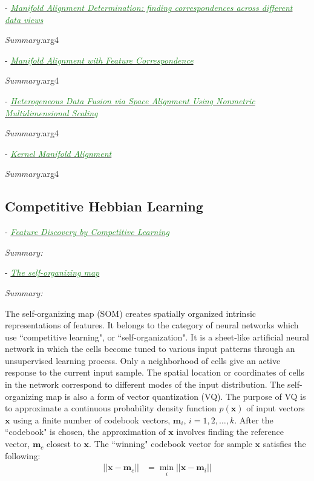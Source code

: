 \documentclass[]{article}
\newcommand{\paperentry}[4]{
            \hangindent=1cm
            \cite{#1} - \href{run:../References/#3}{\textcolor{ForestGreen}{\textit{#2}}}
            
            \noindent            
            \begin{minipage}[t]{0.1\linewidth}\hfill\end{minipage}
            \begin{minipage}[t]{0.8\linewidth}\textcolor{NavyBlue}{{\textit{Summary:}}}#4\end{minipage}
            \vspace{.25cm}
          }
\begin{document}
		\paperentry{Damianou2017ManifoldAlignmentDifferentDataView}
		{Manifold Alignment Determination: finding correspondences across different data views}
		{Manifold_Representation_Learning/Alignment/Damianou2017ManifoldAlignmentDifferentDataView.pdf}
		{arg4}
		
		\paperentry{Stanley2019ManAlignmentFeatureCorrespondence}
		{Manifold Alignment with Feature Correspondence}
		{Manifold_Representation_Learning/Alignment/Stanley2019ManAlignmentFeatureCorrespondence.pdf}
		{arg4}
		
		\paperentry{Choo2012HeterogeneousDataFusionGraphs}
		{Heterogeneous Data Fusion via Space Alignment Using Nonmetric Multidimensional Scaling}
		{Manifold_Representation_Learning/Alignment/Choo2012HeterogeneousDataFusionGraphs.pdf}
		{arg4}
		
		\paperentry{Tuia2015KernelManifoldAlignment}
		{Kernel Manifold Alignment}
		{Manifold_Representation_Learning/Alignment/Tuia2015KernelManifoldAlignment.pdf}
		{arg4}
	
	
	\subsection{Competitive Hebbian Learning}
	
	\paperentry
	{Rumelhart1985CHL}
	{Feature Discovery by Competitive Learning}
	{Manifold_Representation_Learning/CHL/Rumelhart1985CHL.pdf}
	{}
	
	\paperentry{Kohonen1990SOM}
	{The self-organizing map}
	{Manifold_Representation_Learning/CHL/Kohonen1990SOM.pdf}
	{}
	\newline
	The self-organizing map (SOM) creates spatially organized intrinsic representations of features.  It belongs to the category of neural networks which use ``competitive learning", or ``self-organization".  It is a sheet-like artificial neural network in which the cells become tuned to various input patterns through an unsupervised learning process.  Only a neighborhood of cells give an active response to the current input sample.  The spatial location or coordinates of cells in the network correspond to different modes of the input distribution. The self-organizing map is also a form of vector quantization (VQ).  The purpose of VQ is to approximate a continuous probability density function $p(\bm{x})$ of input vectors $\bm{x}$ using a finite number of codebook vectors, $\bm{m}_i$, $i=1,2,\dots,k$.  After the ``codebook" is chosen, the approximation of $\bm{x}$ involves finding the reference vector, $\bm{m}_c$ closest to $\bm{x}$.  The ``winning" codebook vector for sample $\bm{x}$ satisfies the following:
	\begin{align*}
		|| \bm{x} - \bm{m}_c|| &= \min_{i}|| \bm{x} - \bm{m}_{i} ||
	\end{align*}	
	\noindent
	
\end{document}
